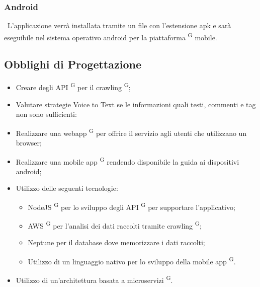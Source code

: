 \subsubsection{Android} \ 
L'applicazione verrà installata tramite un file con l’estensione apk e sarà eseguibile nel sistema operativo android per la piattaforma \textsuperscript{G} mobile.

\subsection{Obblighi di Progettazione}
\begin{itemize}
  \item Creare degli API \textsuperscript{G} per il crawling \textsuperscript{G};
  \item Valutare strategie Voice to Text se le informazioni quali testi, commenti e tag non sono sufficienti:
  \item Realizzare una webapp \textsuperscript{G} per offrire il servizio agli utenti che utilizzano un browser;
  \item Realizzare una mobile app \textsuperscript{G} rendendo disponibile la guida ai dispositivi android;
  \item Utilizzo delle seguenti tecnologie: 
  \begin{itemize}
    \item NodeJS \textsuperscript{G} per lo sviluppo degli API \textsuperscript{G} per supportare l’applicativo;
    \item AWS \textsuperscript{G} per l'analisi dei dati raccolti tramite crawling \textsuperscript{G};
    \item Neptune per il database dove memorizzare i dati raccolti;
    \item Utilizzo di un linguaggio nativo per lo sviluppo della mobile app \textsuperscript{G}.
  \end{itemize}
  \item Utilizzo di un'architettura basata a microservizi \textsuperscript{G}.

\end{itemize}
